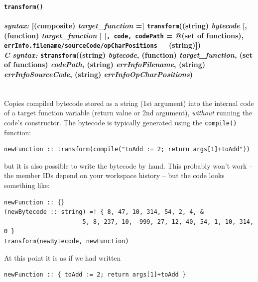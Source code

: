 \documentclass{article}
\newenvironment{code}{
       \begin{list}{}{
               \setlength{\leftmargin}{.4in}
               \setlength{\rightmargin}{0in}
               \setlength{\topsep}{.2in}
       }
       \small
       \item[] }
       { \end{list}   }
\begin{document}
\paragraph{\texttt{transform()}\\\\
\normalfont \emph{syntax: } [(composite) \emph{target\_function} =] \texttt{transform}((string) \emph{bytecode} [, (function) \emph{target\_function} ] [\texttt{, code, codePath} = @(set of functions), \texttt{errInfo.filename/sourceCode/opCharPositions} = (string)])\\
\normalfont \emph{C syntax: } \texttt{\$transform}((string) \emph{bytecode}, (function) \emph{target\_function}, (set of functions) \emph{codePath}, (string) \emph{errInfoFilename}, (string) \emph{errInfoSourceCode}, (string) \emph{errInfoOpCharPositions})\\\\}

Copies compiled bytecode stored as a string (1st argument) into the internal code of a target function variable (return value or 2nd argument), \emph{without} running the code's constructor.  The bytecode is typically generated using the \verb#compile()# function:

\begin{code} \begin{verbatim}
newFunction :: transform(compile("toAdd := 2; return args[1]+toAdd"))
\end{verbatim} \end{code}

\noindent but it is also possible to write the bytecode by hand.  This probably won't work -- the member IDs depend on your workspace history -- but the code looks something like:

\begin{code} \begin{verbatim}
newFunction :: {}
(newBytecode :: string) =! { 8, 47, 10, 314, 54, 2, 4, &
                      5, 8, 237, 10, -999, 27, 12, 40, 54, 1, 10, 314, 0 }
transform(newBytecode, newFunction)
\end{verbatim} \end{code}

\noindent At this point it is as if we had written

\begin{code} \begin{verbatim}
newFunction :: { toAdd := 2; return args[1]+toAdd }
\end{verbatim} \end{code}
\end{document}
